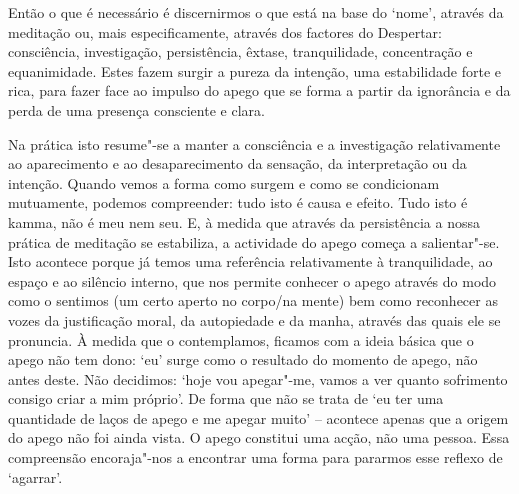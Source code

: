 Então o que é necessário é discernirmos o que está na base do `nome', através da
meditação ou, mais especificamente, através dos factores do Despertar:
consciência, investigação, persistência, êxtase, tranquilidade, concentração e
equanimidade. Estes fazem surgir a pureza da intenção, uma estabilidade forte e
rica, para fazer face ao impulso do apego que se forma a partir da ignorância e
da perda de uma presença consciente e clara.

Na prática isto resume"-se a manter a consciência e a investigação relativamente
ao aparecimento e ao desaparecimento da sensação, da interpretação ou da
intenção. Quando vemos a forma como surgem e como se condicionam mutuamente,
podemos compreender: tudo isto é causa e efeito. Tudo isto é kamma, não é meu
nem seu. E, à medida que através da persistência a nossa prática de meditação se
estabiliza, a actividade do apego começa a salientar"-se. Isto acontece porque
já temos uma referência relativamente à tranquilidade, ao espaço e ao silêncio
interno, que nos permite conhecer o apego através do modo como o sentimos (um
certo aperto no corpo/na mente) bem como reconhecer as vozes da justificação
moral, da autopiedade e da manha, através das quais ele se pronuncia. À medida
que o contemplamos, ficamos com a ideia básica que o apego não tem dono: `eu'
surge como o resultado do momento de apego, não antes deste. Não decidimos:
`hoje vou apegar"-me, vamos a ver quanto sofrimento consigo criar a mim
próprio'. De forma que não se trata de `eu ter uma quantidade de laços de apego
e me apegar muito' -- acontece apenas que a origem do apego não foi ainda vista.
O apego constitui uma acção, não uma pessoa. Essa compreensão encoraja"-nos a
encontrar uma forma para pararmos esse reflexo de `agarrar'.

